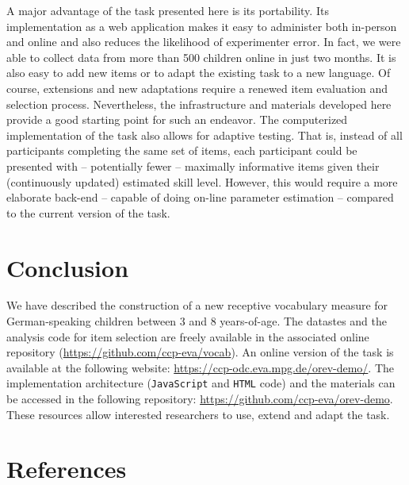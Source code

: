\documentclass[
  man,floatsintext]{apa6}
\begin{document}
A major advantage of the task presented here is its portability. Its implementation as a web application makes it easy to administer both in-person and online and also reduces the likelihood of experimenter error. In fact, we were able to collect data from more than 500 children online in just two months. It is also easy to add new items or to adapt the existing task to a new language. Of course, extensions and new adaptations require a renewed item evaluation and selection process. Nevertheless, the infrastructure and materials developed here provide a good starting point for such an endeavor. The computerized implementation of the task also allows for adaptive testing. That is, instead of all participants completing the same set of items, each participant could be presented with -- potentially fewer -- maximally informative items given their (continuously updated) estimated skill level. However, this would require a more elaborate back-end -- capable of doing on-line parameter estimation -- compared to the current version of the task.

\hypertarget{conclusion}{%
\section{Conclusion}\label{conclusion}}

We have described the construction of a new receptive vocabulary measure for German-speaking children between 3 and 8 years-of-age. The datastes and the analysis code for item selection are freely available in the associated online repository (\url{https://github.com/ccp-eva/vocab}). An online version of the task is available at the following website: \url{https://ccp-odc.eva.mpg.de/orev-demo/}. The implementation architecture (\texttt{JavaScript} and \texttt{HTML} code) and the materials can be accessed in the following repository: \url{https://github.com/ccp-eva/orev-demo}. These resources allow interested researchers to use, extend and adapt the task.

\newpage

\hypertarget{references}{%
\section{References}\label{references}}
\end{document}
